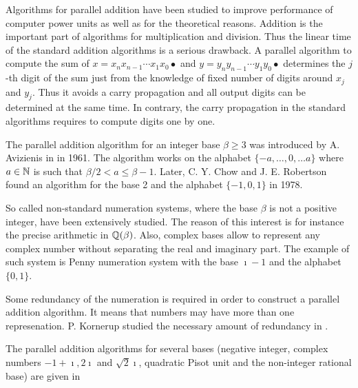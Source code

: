 Algorithms for parallel addition have been studied to improve performance of computer power units as well as for the theoretical reasons. Addition is the important part of algorithms for multiplication and division. Thus the linear time of the standard addition algorithms is a serious drawback. A parallel algorithm to compute the sum of $x=x_n x_{n-1}\cdots x_1 x_0 \bullet$ and $y=y_n y_{n-1}\cdots y_1 y_0 \bullet$ determines the $j$-th digit of the sum just from the knowledge of fixed number of digits around $x_j$ and $y_j$. Thus it avoids a carry propagation and all output digits can be determined at the same time. In contrary, the carry propagation in the standard algorithms requires to compute digits one by one.

The parallel addition algorithm for an integer base $\beta\geq3$ was introduced by A. Avizienis in \cite{avizienis} in 1961. The algorithm works on the alphabet $\{-a, \dots, 0, \dots a\}$ where $a\in\mathbb{N}$ is such that $\beta/2 <a \leq \beta-1$. Later, C. Y. Chow and J. E. Robertson \cite{chow} found an algorithm for the base 2 and the alphabet $\{-1,0,1\}$ in 1978.   

So called non-standard numeration systems, where the base $\beta$ is not a positive integer, have been extensively studied. The reason of this interest is for instance the precise arithmetic in $\mathbb{Q}(\beta)$. Also, complex bases allow to represent any complex number without separating the real and imaginary part. The example of such system is Penny numeration system with the base $\imath -1$ and the alphabet $\{0,1\}$.

Some redundancy of the numeration is required in order to construct a parallel addition algorithm. It means that numbers may have more than one represenation. P. Kornerup studied the necessary amount of redundancy in \cite{kornerup}. 

 The parallel addition algorithms for several bases (negative integer, complex numbers $-1+\imath, 2\imath$ and $\sqrt{2}\imath$, quadratic Pisot unit and the non-integer rational base) are given in \cite{minAlph}     